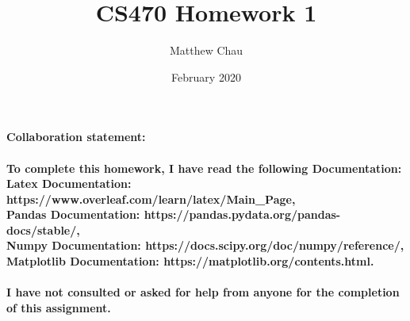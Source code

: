 \documentclass{article}
\title{CS470 Homework 1}
\author{Matthew Chau}
\date{February 2020}
\begin{document}
\maketitle
\noindent
\textbf{Collaboration statement: \\\\
To complete this homework, I have read the following Documentation: \\Latex Documentation: https://www.overleaf.com/learn/latex/Main\_Page, \\Pandas Documentation:  https://pandas.pydata.org/pandas-docs/stable/, \\Numpy Documentation:  https://docs.scipy.org/doc/numpy/reference/, \\Matplotlib Documentation: https://matplotlib.org/contents.html. \\\\
I have not consulted or asked for help from anyone for the completion of this assignment.
}
\end{document}
